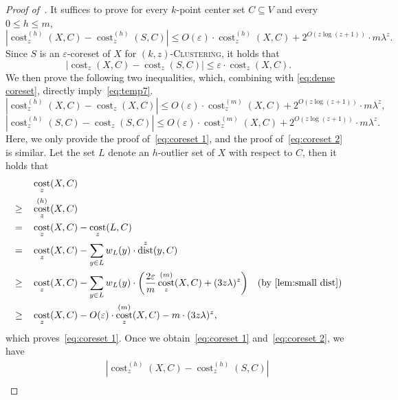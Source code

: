 \documentclass[letterpaper,11pt]{article}
\theoremstyle{plain}
\theoremstyle{definition}
\theoremstyle{remark}
\DeclareMathOperator{\cost}{cost}
\DeclareMathOperator{\dist}{dist}
\newcommand{\eps}{\varepsilon}
\newcommand{\ProblemName}[1]{\textsc{#1}}
\newcommand{\kzC}{\ProblemName{$(k,z)$-Clustering}\xspace}
\begin{document}
\begin{proof}[Proof of~]
    It suffices to prove for every $k$-point center set $C\subseteq V$ and every $0\le h\le m$,
    \begin{equation}
        \label{eq:temp7}
        \left|\cost_z^{(h)}(X,C) - \cost_z^{(h)}(S,C) \right|\le O(\eps)\cdot\cost_z^{(h)}(X,C) + 2^{O(z\log(z+1))}\cdot m\lambda^z.
    \end{equation}
    Since $S$ is an $\eps$-coreset of $X$ for \kzC, it holds that 
    \begin{equation}
        \label{eq:dense coreset}
        \left|\cost_z(X,C) - \cost_z(S,C)\right|\le \eps \cdot\cost_z(X,C).
    \end{equation}
    We then prove the following two inequalities, which, combining with \eqref{eq:dense coreset}, directly imply~\eqref{eq:temp7}.
    \begin{equation}
        \label{eq:coreset 1}
        \left|\cost_z^{(h)}(X,C) - \cost_z(X,C) \right|\le O(\eps)\cdot \cost_z^{(m)}(X,C) + 2^{O(z\log(z+1))}\cdot m\lambda^z, 
    \end{equation}
    \begin{equation}
        \label{eq:coreset 2}
        \left|\cost_z^{(h)}(S,C) - \cost_z(S,C) \right|\le O(\eps)\cdot \cost_z^{(m)}(X,C) + 2^{O(z\log(z+1))}\cdot m\lambda^z.
    \end{equation}
    Here, we only provide the proof of~\eqref{eq:coreset 1}, and the proof of~\eqref{eq:coreset 2} is similar.
    Let the set $L$ denote an $h$-outlier set of $X$ with respect to $C$, then it holds that 
    \begin{align*}
        &\quad \cost_z(X,C)\\
        \ge&\quad \cost_z^{(h)}(X,C)\\
        =&\quad \cost_z(X,C) - \cost_z(L,C)\\
        =&\quad\cost_z(X,C) - \sum_{y\in L}w_L(y)\cdot\dist^z(y,C)\\
        \ge&\quad \cost_z(X,C) - \sum_{y\in L}w_L(y)\cdot \left(\frac{2\eps}{m}\cost_z^{(m)}(X,C) + (3z\lambda)^z \right) & \text{(by~\Cref{lem:small dist})}\\
        \ge&\quad \cost_z(X,C) - O(\eps)\cdot \cost_z^{(m)}(X,C) - m\cdot (3z\lambda)^z,
    \end{align*}
    which proves~\eqref{eq:coreset 1}. Once we obtain~\eqref{eq:coreset 1} and~\eqref{eq:coreset 2}, we have 
    \begin{align*}
        &\quad\left|\cost_z^{(h)}(X,C) - \cost_z^{(h)}(S,C) \right|\\

\end{align*}
\end{proof}
\end{document}
